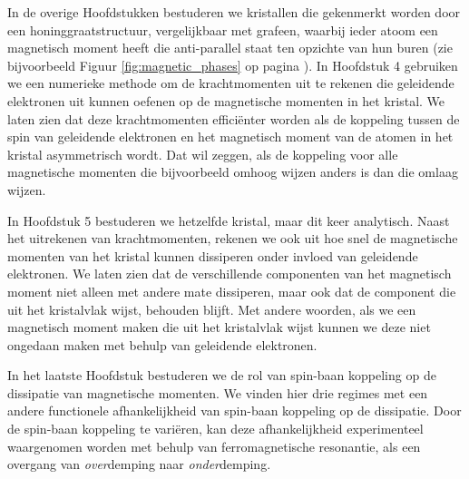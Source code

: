 In de overige Hoofdstukken bestuderen we kristallen die gekenmerkt worden door een honinggraatstructuur, vergelijkbaar met grafeen, waarbij ieder atoom een magnetisch moment heeft die anti-parallel staat ten opzichte van hun buren (zie bijvoorbeeld Figuur \ref{fig:magnetic_phases} op pagina \pageref{fig:magnetic_phases}). In Hoofdstuk 4 gebruiken we een numerieke methode om de krachtmomenten uit te rekenen die geleidende elektronen uit kunnen oefenen op de magnetische momenten in het kristal. We laten zien dat deze krachtmomenten efficiënter worden als de koppeling tussen de spin van geleidende elektronen en het magnetisch moment van de atomen in het kristal asymmetrisch wordt. Dat wil zeggen, als de koppeling voor alle magnetische momenten die bijvoorbeeld omhoog wijzen anders is dan die omlaag wijzen. 

In Hoofdstuk 5 bestuderen we hetzelfde kristal, maar dit keer analytisch. Naast het uitrekenen van krachtmomenten, rekenen we ook uit hoe snel de magnetische momenten van het kristal kunnen dissiperen onder invloed van geleidende elektronen. We laten zien dat de verschillende componenten van het magnetisch moment niet alleen met andere mate dissiperen, maar ook dat de component die uit het kristalvlak wijst, behouden blijft. Met andere woorden, als we een magnetisch moment maken die uit het kristalvlak wijst kunnen we deze niet ongedaan maken met behulp van geleidende elektronen. 

In het laatste Hoofdstuk bestuderen we de rol van spin-baan koppeling op de dissipatie van magnetische momenten. We vinden hier drie regimes met een andere functionele afhankelijkheid van spin-baan koppeling op de dissipatie. Door de spin-baan koppeling te vari\"eren, kan deze afhankelijkheid experimenteel waargenomen worden met behulp van ferromagnetische resonantie, als een overgang van \emph{over}demping naar \emph{onder}demping.  
